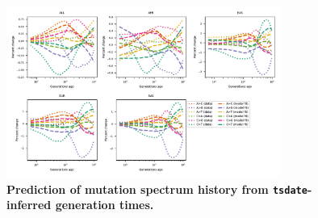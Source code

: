 \documentclass[]{article}
\newcommand{\tsdate}{\texttt{tsdate}\xspace}
\begin{document}
\begin{figure}[ht!]
    \centering
    \includegraphics[width=0.8\textwidth]{../plots/goodness-of-fit.DM.tsdate.max_age.10000.pdf}
    \caption{
        \textbf{Prediction of mutation spectrum history from
        \tsdate-inferred generation times.}
    }
    \label{fig:tsdate-fit}
\end{figure}


\break
\end{document}
